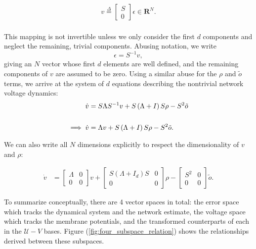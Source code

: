 \begin{enumerate}
\begin{align}
\label{eq:rotated_voltage_def}
v \overset{\Delta}{=} \begin{bmatrix}
S \\ 0
\end{bmatrix} \epsilon \in \mathbf{R}^N.
\end{align}
\\
This mapping is not invertible unless we only consider the first $d$ components and neglect the remaining, trivial components. Abusing notation, we write  
$$
\epsilon = S^{-1} v, 
$$
giving an $N$ vector whose first $d$ elements are well defined, and the remaining components of $v$ are assumed to be zero. Using a similar abuse for the $\rho$ and $\tilde{o}$ terms, we arrive at the system of $d$ equations describing the nontrivial network voltage dynamics:
\begin{align}
\label{eq:rotated_voltage_dynamics}
\dot{v}
&= 
S\Lambda S^{-1} v + S \left(\Lambda + I \right) S \rho
- S^2 \tilde{o} \notag
\\ \notag
\\
\implies
\dot{v}
&= 
\Lambda v + S \left(\Lambda + I \right) S \rho - S^2 \tilde{o}.
\end{align}

We can also write all $N$ dimensions explicitly to respect the dimensionality of $v$ and $\rho$:

\begin{align*}
\dot{v}
&= 
\begin{bmatrix}
\Lambda & 0
\\
0 & 0
\end{bmatrix}
v +
\begin{bmatrix}
S \left(\Lambda + I_d \right) S & 0
\\
0 & 0
\end{bmatrix}
  \rho - 
 \begin{bmatrix}
S^2 & 0
\\
0 & 0
\end{bmatrix}
    \tilde{o}.
\end{align*}

To summarize conceptually, there are 4 vector spaces in total: the error space which tracks the dynamical system and the network estimate, the voltage space which tracks the membrane potentials, and the transformed counterparts of each in the $\mathcal{U}-V$ bases. Figure (\ref{fig:four_subspace_relation}) shows the relationships derived between these subspaces.


\end{enumerate}
